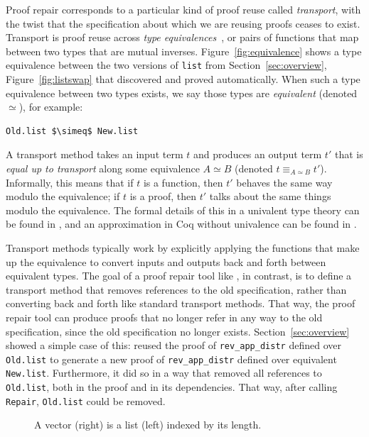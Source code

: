 Proof repair corresponds to a particular kind of proof reuse called \textit{transport},
with the twist that the specification about which we are reusing proofs ceases to exist.
Transport is proof reuse across \textit{type equivalences}~\cite{univalent2013homotopy},
or pairs of functions that map between two types that are mutual inverses.
Figure~\ref{fig:equivalence} shows a type equivalence between the two versions of \lstinline{list}
from Section~\ref{sec:overview}, Figure~\ref{fig:listswap} that \toolname discovered and proved automatically.
When such a type equivalence between two types exists, we say those types are \textit{equivalent} (denoted $\simeq$), for example:

\begin{lstlisting}
Old.list $\simeq$ New.list
\end{lstlisting}

A transport method takes an input term $t$ and produces an output term $t'$ that is \textit{equal up to transport}
along some equivalence $A \simeq B$ (denoted $t \equiv_{A \simeq B} t'$). Informally, this means that if $t$ is a function, then $t'$ behaves the same way modulo the equivalence;
if $t$ is a proof, then $t'$ talks about the same things modulo the equivalence.
The formal details of this in a univalent type theory can be found in \citet{univalent2013homotopy}, and an approximation in Coq
without univalence can be found in \citet{tabareau2017equivalences}.

Transport methods typically work by explicitly applying the functions that make up the equivalence to convert
inputs and outputs back and forth between equivalent types.
The goal of a proof repair tool like \toolname, in contrast, is to define a transport method that
removes references to the old specification, rather than converting back and forth like standard transport methods.
That way, the proof repair tool can produce proofs that no longer refer in any way to the old specification,
since the old specification no longer exists.
Section~\ref{sec:overview} showed a simple case of this: \toolname
reused the proof of \lstinline{rev_app_distr} defined over \lstinline{Old.list}
to generate a new proof of \lstinline{rev_app_distr} defined over equivalent \lstinline{New.list}.
Furthermore, it did so in a way that removed all references to \lstinline{Old.list}, both in the proof
and in its dependencies.
That way, after calling \lstinline{Repair}, \lstinline{Old.list} could be removed.

\begin{figure}
\begin{minipage}{0.40\textwidth}
   
\end{minipage}
\hfill
\begin{minipage}{0.58\textwidth}
   
\end{minipage}
\vspace{-0.3cm}
\caption{A vector (right) is a list (left) indexed by its length.}
\label{fig:listtovect}
\end{figure}


